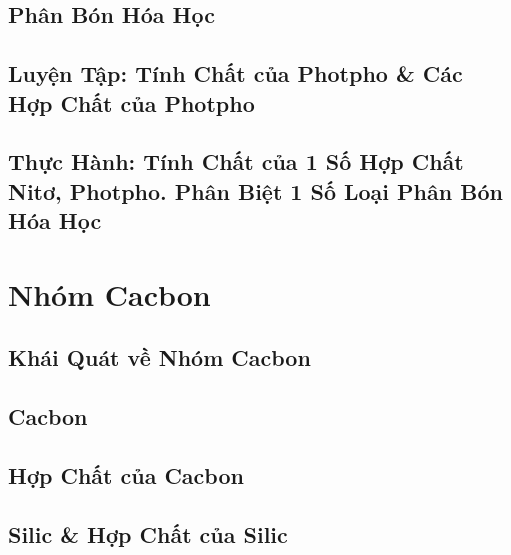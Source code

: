 \documentclass[oneside]{book}
\numberwithin{equation}{section}
\begin{document}
\section{Phân Bón Hóa Học}


\section{Luyện Tập: Tính Chất của Photpho \& Các Hợp Chất của Photpho}


\section{Thực Hành: Tính Chất của 1 Số Hợp Chất Nitơ, Photpho. Phân Biệt 1 Số Loại Phân Bón Hóa Học}


\chapter{Nhóm Cacbon}

\section{Khái Quát về Nhóm Cacbon}


\section{Cacbon}


\section{Hợp Chất của Cacbon}


\section{Silic \& Hợp Chất của Silic}
\end{document}

